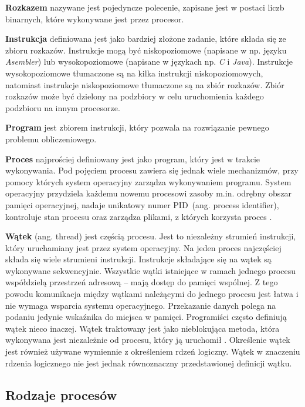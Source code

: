 \documentclass[12pt]{article}
\begin{document}
\textbf{Rozkazem} nazywane jest pojedyncze polecenie, zapisane jest w postaci liczb binarnych, które
wykonywane jest przez procesor.

\textbf{Instrukcja} definiowana jest jako bardziej złożone zadanie, które składa się ze zbioru rozkazów. Instrukcje
mogą być niskopoziomowe (napisane w np. języku \textit{Asembler}) lub wysokopoziomowe (napisane w językach np. \textit{C} i \textit{Java}).
Instrukcje wysokopoziomowe tłumaczone są na kilka instrukcji niskopoziomowych, natomiast instrukcje
niskopoziomowe tłumaczone są na zbiór rozkazów. Zbiór rozkazów może być dzielony na podzbiory w celu
uruchomienia każdego podzbioru na innym procesorze.

\textbf{Program} jest zbiorem instrukcji, który pozwala na rozwiązanie pewnego problemu obliczeniowego. 

\textbf{Proces} najprościej definiowany jest jako program, który jest w trakcie wykonywania. Pod pojęciem procesu zawiera
się jednak wiele mechanizmów, przy pomocy których system operacyjny zarządza wykonywaniem programu.
System operacyjny przydziela każdemu nowemu procesowi zasoby m.in. odrębny obszar pamięci operacyjnej, nadaje
unikatowy numer PID~(ang. process identifier), kontroluje stan procesu oraz zarządza plikami, z których korzysta proces \cite{programowanie-rozproszone-i-rownolegle}.

\textbf{Wątek} (ang. thread) jest częścią procesu. Jest to niezależny strumień instrukcji, który uruchamiany jest przez system operacyjny.
Na jeden proces najczęściej składa się wiele strumieni instrukcji. Instrukcje składające się na wątek są wykonywane sekwencyjnie.
Wszystkie wątki istniejące w ramach jednego procesu współdzielą przestrzeń adresową -- mają dostęp do pamięci wspólnej.
Z tego powodu komunikacja między wątkami należącymi do jednego procesu jest łatwa i nie wymaga wsparcia systemu operacyjnego.
Przekazanie danych polega na podaniu jedynie wskaźnika do miejsca w pamięci.
Programiści często definiują wątek nieco inaczej. Wątek traktowany jest jako nieblokująca metoda, która wykonywana jest
niezależnie od procesu, który ją uruchomił \cite{programowanie-rozproszone-i-rownolegle}. Określenie wątek jest również używane
wymiennie z określeniem rdzeń logiczny. Wątek w znaczeniu rdzenia logicznego nie jest jednak równoznaczny przedstawionej definicji wątku.

\subsection{Rodzaje procesów}
\end{document}
